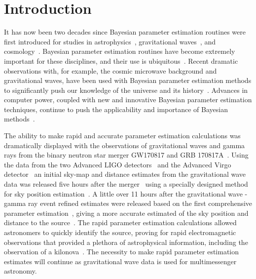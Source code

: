 \documentclass[aps,reprint,amsmath,amssymb,showpacs,showkeys]{revtex4-1}%
\begin{document}



\maketitle

\section{Introduction}

It has now been two decades since Bayesian parameter estimation routines were first introduced for studies in astrophysics~\cite{1994AJ....107.1295S}, gravitational waves~\cite{PhysRevD.58.082001}, and cosmology~\cite{0264-9381-18-14-306,1538-4357-563-2-L95}. Bayesian parameter estimation routines have become extremely important for these disciplines, and their use is ubiquitous~\cite{doi:10.1146/annurev-astro-082214-122339}. 
Recent dramatic observations with, for example, the cosmic microwave background and gravitational waves, have been used with Bayesian parameter estimation methods to significantly push our knowledge of the universe and its history~\cite{0067-0049-208-2-19, Planck2013,Planck2015, PhysRevLett.116.061102,PhysRevLett.116.241102,doi:10.1111/j.1740-9713.2016.00896.x,PhysRevLett.119.161101}. Advances in computer power, coupled with new and innovative Bayesian parameter estimation techniques, continue to push the applicability and importance of Bayesian methods~\cite{doi:10.1093/nsr/nwx044}.

The ability to make rapid and accurate parameter estimation calculations was dramatically displayed with the observations of gravitational waves and gamma rays from the binary neutron star merger GW170817 and GRB 170817A~\cite{PhysRevLett.119.161101,2041-8205-848-2-L14}. Using the data from the two Advanced LIGO detectors~\cite{0264-9381-32-7-074001} and the Advanced Virgo detector~\cite{0264-9381-32-2-024001} an initial sky-map and distance estimates from the gravitational wave data was released five hours after the merger~\cite{2041-8205-848-2-L12} using a specially designed method for sky position estimation~\cite{PhysRevD.93.024013}. A little over 11 hours after the gravitational wave - gamma ray event refined estimates were released based on the first comprehensive parameter estimation~\cite{Veitch:2015}, giving a more accurate estimated of the sky position and distance to the source~\cite{2041-8205-848-2-L12}. The rapid parameter estimation calculations allowed astronomers to quickly identify the source, proving for rapid electromagnetic observations that provided a plethora of astrophysical information, including the observation of a kilonova~\cite{2041-8205-848-2-L12}. The necessity to make rapid parameter estimation estimates will continue as gravitational wave data is used for multimessenger astronomy.
\end{document}
